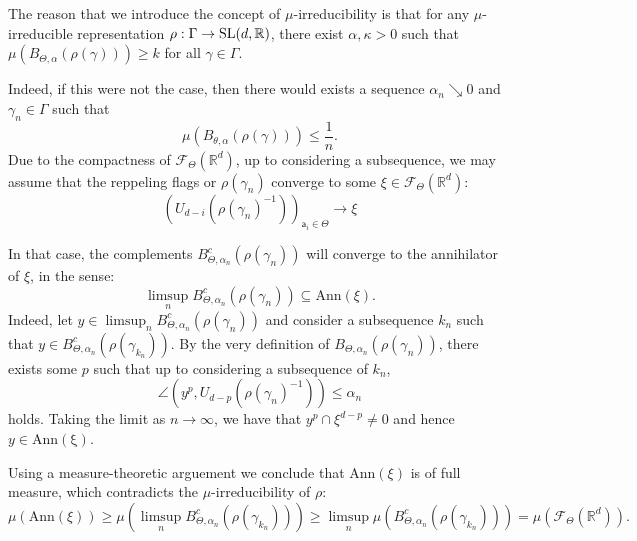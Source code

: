 \documentclass{report}
\begin{document}
\begin{remark}
    The reason that we introduce the concept of $\mu$-irreducibility is that for any $\mu$-irreducible representation $\rho:\Gamma \to \operatorname{{\mathrm{SL}}}(d,\mathbb R)$, there exist $\alpha, \kappa > 0$ such that $\mu(B_{\Theta, \alpha}(\rho(\gamma))) \geq k$ for all $\gamma \in \Gamma$.

    Indeed, if this were not the case, then there would exists a sequence $\alpha_n \searrow 0$ and $\gamma_n \in \Gamma$ such that
    \[
        \mu(B_{\theta, \alpha}(\rho(\gamma))) \leq \frac{1}{n}.
    \]
    Due to the compactness of $\mathcal F_{\Theta} (\mathbb R^d)$, up to considering a subsequence, we may assume that the reppeling flags or $\rho(\gamma_n)$ converge to some $\xi \in \mathcal F_{\Theta} (\mathbb R^d)$:
    \[
        (U_{d-i}(\rho(\gamma_n)^{-1}))_{\mathsf a_i \in \Theta} \to \xi
    \]
    
    In that case, the complements $B_{\Theta, \alpha_n}^c(\rho(\gamma_n))$ will converge to the annihilator of $\xi$, in the sense:
    \[
        \limsup_n B_{\Theta, \alpha_n}^c(\rho(\gamma_n)) \subseteq \mathrm{Ann}(\xi).
    \]
    Indeed, let $y\in \limsup_n  B_{\Theta, \alpha_n}^c(\rho(\gamma_n))$ and consider a subsequence $k_n$ such that $y\in B_{\Theta, \alpha_n}^c(\rho(\gamma_{k_n}))$.
    By the very definition of $B_{\Theta, \alpha_n}(\rho(\gamma_n))$, there exists some $p$ such that up to considering a subsequence of $k_n$,
    \[
        \angle (y^p, U_{d-p}(\rho(\gamma_n)^{-1})) \leq \alpha_n
    \]
    holds.
    Taking the limit as $n \to \infty$, we have that $y^p \cap \xi^{d-p} \neq 0$ and hence $y \in \mathrm{Ann(\xi)}$.

    Using a measure-theoretic arguement we conclude that $\mathrm{Ann}(\xi)$ is of full measure, which contradicts the $\mu$-irreducibility of $\rho$:
    \[
        \mu(\mathrm{Ann}(\xi)) \geq
        \mu (\limsup_n B_{\Theta, \alpha_n}^c(\rho(\gamma_{k_n})) ) \geq 
        \limsup_n \mu (B_{\Theta, \alpha_n}^c(\rho(\gamma_{k_n}))) =
        \mu(\mathcal F_\Theta (\mathbb R^d)).
    \]
\end{remark}
\end{document}
